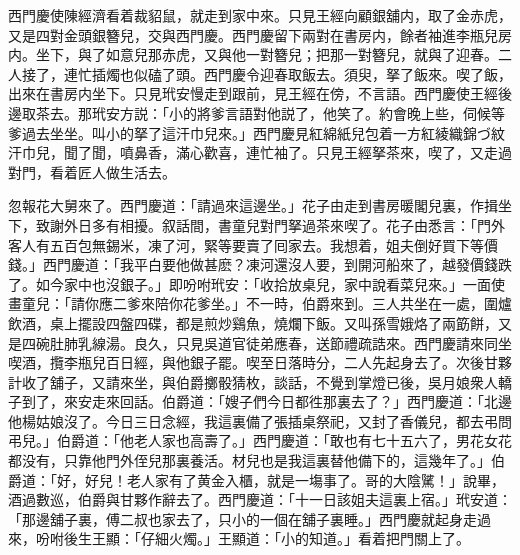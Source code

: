 西門慶使陳經濟看着裁貂鼠，就走到家中來。只見王經向顧銀舖内，取了金赤虎，又是四對金頭銀簪兒，交與西門慶。西門慶留下兩對在書房内，餘者袖進李瓶兒房内。坐下，與了如意兒那赤虎，又與他一對簪兒；把那一對簪兒，就與了迎春。二人接了，連忙插燭也似磕了頭。西門慶令迎春取飯去。須臾，拏了飯來。喫了飯，出來在書房内坐下。只見玳安慢走到跟前，見王經在傍，不言語。西門慶使王經後邊取茶去。那玳安方説：「小的將爹言語對他説了，他笑了。約會晚上些，伺候等爹過去坐坐。叫小的拏了這汗巾兒來。」西門慶見紅綿紙兒包着一方紅綾織錦づ紋汗巾兒，聞了聞，噴鼻香，滿心歡喜，連忙袖了。只見王經拏茶來，喫了，又走過對門，看着匠人做生活去。

忽報花大舅來了。西門慶道：「請過來這邊坐。」花子由走到書房暖閣兒裏，作揖坐下，致謝外日多有相擾。叙話間，書童兒對門拏過茶來喫了。花子由悉言：「門外客人有五百包無錫米，凍了河，緊等要賣了囘家去。我想着，姐夫倒好買下等價錢。」西門慶道：「我平白要他做甚麽？凍河還沒人要，到開河船來了，越發價錢跌了。如今家中也沒銀子。」即吩咐玳安：「收拾放桌兒，家中說看菜兒來。」一面使畫童兒：「請你應二爹來陪你花爹坐。」不一時，伯爵來到。三人共坐在一處，圍爐飲酒，桌上擺設四盤四碟，都是煎炒鷄魚，燒爛下飯。又叫孫雪娥烙了兩筯餅，又是四碗肚肺乳線湯。良久，只見吳道官徒弟應春，送節禮疏誥來。西門慶請來同坐喫酒，攬李瓶兒百日經，與他銀子罷。喫至日落時分，二人先起身去了。次後甘夥計收了舖子，又請來坐，與伯爵擲骰猜枚，談話，不覺到掌燈已後，吳月娘衆人轎子到了，來安走來回話。伯爵道：「嫂子們今日都徃那裏去了？」西門慶道：「北邊他楊姑娘沒了。今日三日念經，我這裏備了張插桌祭祀，又封了香儀兒，都去弔問弔兒。」伯爵道：「他老人家也高壽了。」西門慶道：「敢也有七十五六了，男花女花都没有，只靠他門外侄兒那裏養活。材兒也是我這裏替他備下的，這幾年了。」伯爵道：「好，好兒！老人家有了黄金入櫃，就是一塲事了。哥的大陰騭！」說畢，酒過數巡，伯爵與甘夥作辭去了。西門慶道：「十一日該姐夫這裏上宿。」玳安道：「那邊舖子裏，傅二叔也家去了，只小的一個在舖子裏睡。」西門慶就起身走過來，吩咐後生王顯：「仔細火燭。」王顯道：「小的知道。」看着把門關上了。

